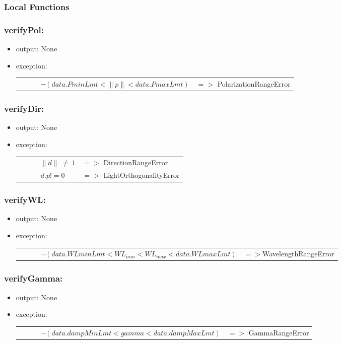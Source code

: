 \documentclass[12pt, titlepage]{article}
\begin{document}
\subsubsection{Local Functions}

\subsubsection*{verifyPol:}
\begin{itemize}
	\item output: None
	\item exception: 
		\begin{longtable*}[l]{l l}
		\ \ \ \ \ \ $\neg(data.PminLmt< \|p\|< data.PmaxLmt)$  & $=>$ PolarizationRangeError\\
	\end{longtable*}

\end{itemize}

\subsubsection*{verifyDir:}
\begin{itemize}
	\item output: None
	\item exception: 
	\noindent \begin{longtable*}[l]{l l}
		\ \ \ \ \ \ $\|d\|\ \neq\ 1$ & $=>$ DirectionRangeError\\
		\ \ \ \ \ \ $d . p != 0$ & $=>$ LightOrthogonalityError\\
	\end{longtable*}
	
\end{itemize}

\subsubsection*{verifyWL:}
\begin{itemize}
	\item output: None
	\item exception: 
	\noindent \begin{longtable*}[l]{l l}
		\ \ \ \ \ \ $\neg (data.WLminLmt<WL_{min}<WL_{max}<data.WLmaxLmt)$ &$=>$WavelengthRangeError\\
	\end{longtable*}
	
\end{itemize}


\subsubsection*{verifyGamma:}
\begin{itemize}
	\item output: None
	\item exception: 
	\noindent \begin{longtable*}[l]{l l}
		\ \ \ \ \ \ $\neg (data.dampMinLmt <  gamma < data.dampMaxLmt)$ & $=>$ GammaRangeError\\
			\end{longtable*}
	
\end{itemize}
\end{document}
